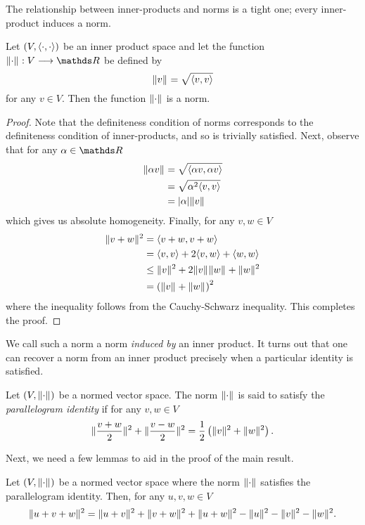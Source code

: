 The relationship between inner-products and norms is a tight one;
every inner-product induces a norm.
\begin{prop}
\label{prop:normInducedByInnerProd}Let $\left(V,\langle\cdot,\cdot\rangle\right)$
be an inner product space and let the function $\pnorm{\cdot}{}:V\longrightarrow\R$
be defined by 
\[
\lVert v\rVert_{}=\sqrt{\langle v,v\rangle}
\]
for any $v\in V$. Then the function $\lVert\cdot\rVert_{}$ is a norm.
\end{prop}

\begin{proof}
Note that the definiteness condition of norms corresponds to the definiteness
condition of inner-products, and so is trivially satisfied. Next,
observe that for any $\alpha\in\R$
\begin{align*}
\lVert\alpha v\rVert_{} & =\sqrt{\langle\alpha v,\alpha v\rangle}\\
 & =\sqrt{\alpha^{2}\langle v,v\rangle}\\
 & =\lvert\alpha\rvert\lVert v\rVert_{}
\end{align*}
which gives us absolute homogeneity. Finally, for any $v,w\in V$
\begin{align*}
\lVert v+w\rVert_{}^{2} & =\langle v+w,v+w\rangle\\
 & =\langle v,v\rangle+2\langle v,w\rangle+\langle w,w\rangle\\
 & \leq\lVert v\rVert_{}^{2}+2\lVert v\rVert_{}\lVert w\rVert_{}+\lVert w\rVert_{}^{2}\\
 & =\left(\lVert v\rVert_{}+\lVert w\rVert_{}\right)^{2}
\end{align*}
where the inequality follows from the Cauchy-Schwarz inequality. This
completes the proof.
\end{proof}
We call such a norm a norm \emph{induced by }an inner product. It
turns out that one can recover a norm from an inner product precisely
when a particular identity is satisfied.
\begin{defn}
\label{def:parallelogram}Let $\left(V,\lVert\cdot\rVert_{}\right)$ be
a normed vector space. The norm $\lVert\cdot\rVert_{}$ is said to satisfy
the \emph{parallelogram identity }if for any $v,w\in V$
\[
\lVert\frac{v+w}{2}\rVert_{}^{2}+\lVert\frac{v-w}{2}\rVert_{}^{2}=\frac{1}{2}\left(\lVert v\rVert_{}^{2}+\lVert w\rVert_{}^{2}\right).
\]
\end{defn}

Next, we need a few lemmas to aid in the proof of the main result.
\begin{lem}
\label{lem:polarization}Let $\left(V,\lVert\cdot\rVert_{}\right)$ be
a normed vector space where the norm $\lVert\cdot\rVert_{}$ satisfies
the parallelogram identity. Then, for any $u,v,w\in V$
\[
\lVert u+v+w\rVert_{}^{2}=\lVert u+v\rVert_{}^{2}+\lVert v+w\rVert_{}^{2}+\lVert u+w\rVert_{}^{2}-\lVert u\rVert_{}^{2}-\lVert v\rVert_{}^{2}-\lVert w\rVert_{}^{2}.
\]
\end{lem}

